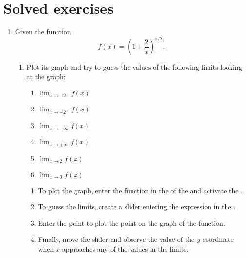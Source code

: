 \section{Solved exercises}
\begin{enumerate}[leftmargin=*]
\item Given the function
      \[
      f(x)=\left( 1+\frac{2}{x}\right) ^{x/2},
      \]

      \begin{enumerate}
      \item Plot its graph and try to guess the values of the following limits looking at the graph:
            \begin{multicols}{2}
            \begin{enumerate}
            \item $\lim_{x\rightarrow -2^-} f(x)$
            \item $\lim_{x\rightarrow -2^+} f(x)$
            \item $\lim_{x\rightarrow -\infty} f(x)$
            \item $\lim_{x\rightarrow +\infty} f(x)$
            \item $\lim_{x\rightarrow 2} f(x)$
            \item $\lim_{x\rightarrow 0} f(x)$
            \end{enumerate}
            \end{multicols}

            \begin{indication}
            \begin{enumerate}
            \item To plot the graph, enter the function  in the  of the  and activate the .
            \item To guess the limits, create a slider entering the expression  in the .
            \item Enter the point  to plot the point on the graph of the function.
            \item Finally, move the slider and observe the value of the $y$ coordinate when $x$ approaches any of the values in the limits.
            \end{enumerate}
            \end{indication}


\end{enumerate}
\end{enumerate}

